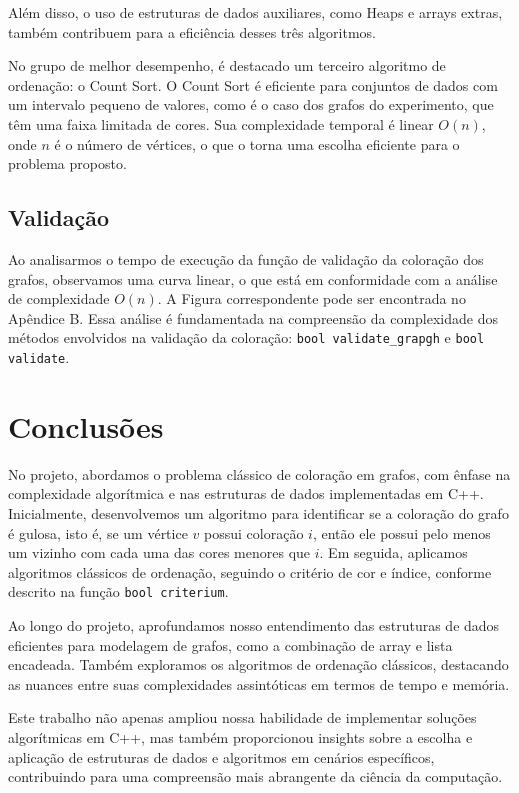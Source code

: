 \documentclass{article}
\begin{document}
Além disso, o uso de estruturas de dados auxiliares, como Heaps e arrays extras, também contribuem para a eficiência desses três algoritmos.

No grupo de melhor desempenho, é destacado um terceiro algoritmo de ordenação: o Count Sort. O Count Sort é eficiente para conjuntos de dados com um intervalo pequeno de valores, como é o caso dos grafos do experimento, que têm uma faixa limitada de cores. Sua complexidade temporal é linear \(O(n)\), onde \(n\) é o número de vértices, o que o torna uma escolha eficiente para o problema proposto.


\subsection{Validação}

Ao analisarmos o tempo de execução da função de validação da coloração dos grafos, observamos uma curva linear, o que está em conformidade com a análise de complexidade \(O(n)\). A Figura correspondente pode ser encontrada no Apêndice B.
Essa análise é fundamentada na compreensão da complexidade dos métodos envolvidos na validação da coloração: \texttt{bool validate\_grapgh} e \texttt{bool validate}.




\section{Conclusões}

No projeto, abordamos o problema clássico de coloração em grafos, com ênfase na complexidade algorítmica e nas estruturas de dados implementadas em C++. Inicialmente, desenvolvemos um algoritmo para identificar se a coloração do grafo é gulosa, isto é, se um vértice \(v\) possui coloração \(i\), então ele possui pelo menos um vizinho com cada uma das cores menores que \(i\). Em seguida, aplicamos algoritmos clássicos de ordenação, seguindo o critério de cor e índice, conforme descrito na função \texttt{bool criterium}.

Ao longo do projeto, aprofundamos nosso entendimento das estruturas de dados eficientes para modelagem de grafos, como a combinação de array e lista encadeada. Também exploramos os algoritmos de ordenação clássicos, destacando as nuances entre suas complexidades assintóticas em termos de tempo e memória.

Este trabalho não apenas ampliou nossa habilidade de implementar soluções algorítmicas em C++, mas também proporcionou insights sobre a escolha e aplicação de estruturas de dados e algoritmos em cenários específicos, contribuindo para uma compreensão mais abrangente da ciência da computação.
\end{document}
